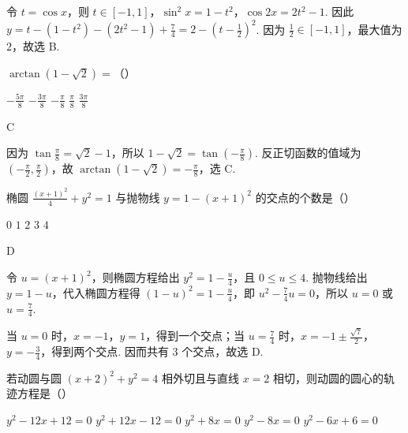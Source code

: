 \documentclass[UTF8,a4paper,oneside,11pt]{ctexbook}
\begin{document}
\begin{solution}
令 \(t=\cos x\)，则 \(t\in[-1,1]\)，\(\sin^2x=1-t^2\)，\(\cos2x=2t^2-1\). 因此 \(y=t-(1-t^2)-(2t^2-1)+\frac{7}{4}=2-\left(t-\frac{1}{2}\right)^2\). 因为 \(\frac{1}{2}\in[-1,1]\)，最大值为 \(2\)，故选 B.
\end{solution}

\begin{problem}

\(\arctan\left(1-\sqrt{2}\right)= \)（\quad）

\choicesfive
    {\(-\frac{5\pi}{8} \)}
    {\(-\frac{3\pi}{8} \)}
    {\(-\frac{\pi}{8} \)}
    {\(\frac{\pi}{8} \)}
    {\(\frac{3\pi}{8} \)}
\end{problem}

\begin{answer}
C
\end{answer}

\begin{solution}
因为 \(\tan\frac{\pi}{8}=\sqrt{2}-1\)，所以 \(1-\sqrt{2}=\tan\left(-\frac{\pi}{8}\right)\). 反正切函数的值域为 \(\left(-\frac{\pi}{2},\frac{\pi}{2}\right)\)，故 \(\arctan(1-\sqrt{2})=-\frac{\pi}{8}\)，选 C.
\end{solution}

\begin{problem}

椭圆 \(\frac{(x+1)^{2}}{4} + y^{2} = 1 \) 与抛物线 \(y = 1 - (x + 1)^{2} \) 的交点的个数是（\quad）

\choicesfive
    {\(0\)}
    {\(1\)}
    {\(2\)}
    {\(3\)}
    {\(4\)}
\end{problem}

\begin{answer}
D
\end{answer}

\begin{solution}
令 \(u=(x+1)^2\)，则椭圆方程给出 \(y^2=1-\frac{u}{4}\)，且 \(0\leq u\leq4\). 抛物线给出 \(y=1-u\)，代入椭圆方程得
\(\left(1-u\right)^2=1-\frac{u}{4}\)，即 \(u^2-\frac{7}{4}u=0\)，所以 \(u=0\) 或 \(u=\frac{7}{4}\).

当 \(u=0\) 时，\(x=-1\)，\(y=1\)，得到一个交点；当 \(u=\frac{7}{4}\) 时，\(x=-1\pm\frac{\sqrt{7}}{2}\)，\(y=-\frac{3}{4}\)，得到两个交点. 因而共有 \(3\) 个交点，故选 D.
\end{solution}

\begin{problem}

若动圆与圆 \((x+2)^{2}+y^{2}=4 \) 相外切且与直线 \(x=2\) 相切，则动圆的圆心的轨迹方程是（\quad）

\choicesfive
    {\(y^{2}-12x+12=0 \)}
    {\(y^{2}+12x-12=0 \)}
    {\(y^{2}+8x=0 \)}
    {\(y^{2}-8x=0 \)}
    {\(y^{2}-6x+6=0 \)}
\end{problem}
\end{document}

